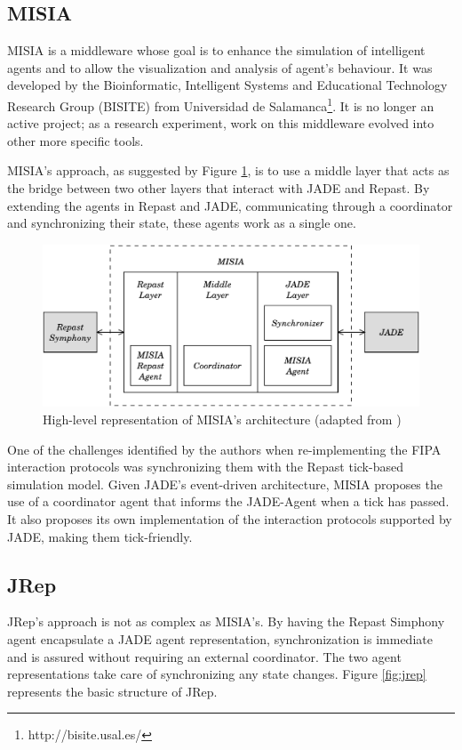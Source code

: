 \documentclass[a4paper,twoside]{article}
\begin{document}
\subsection{MISIA}
MISIA is a middleware whose goal is to enhance the simulation of intelligent agents and to allow the visualization and analysis of agent's behaviour. It was developed by the Bioinformatic, Intelligent Systems and Educational Technology Research Group (BISITE) from Universidad de Salamanca\footnote{http://bisite.usal.es/}. It is no longer an active project; as a research experiment, work on this middleware evolved into other more specific tools.

MISIA's approach, as suggested by Figure \ref{fig:misia}, is to use a middle layer that acts as the bridge between two other layers that interact with JADE and Repast. By extending the agents in Repast and JADE, communicating through a coordinator and synchronizing their state, these agents work as a single one.

\begin{figure}
	\centering
	\includegraphics[width=\linewidth]{../figures/MISIA.pdf}
	\caption[MISIA's architecture]{High-level representation of MISIA's architecture (adapted from \cite{garcia2011misia})}
	\label{fig:misia}
\end{figure}

One of the challenges identified by the authors when re-implementing the FIPA interaction protocols was synchronizing them with the Repast tick-based simulation model. Given JADE's event-driven architecture, MISIA proposes the use of a coordinator agent that informs the JADE-Agent when a tick has passed. It also proposes its own implementation of the interaction protocols supported by JADE, making them tick-friendly.

\subsection{JRep}
JRep's approach is not as complex as MISIA's. By having the Repast Simphony agent encapsulate a JADE agent representation, synchronization is immediate and is assured without requiring an external coordinator.
The two agent representations take care of synchronizing any state changes.
Figure \ref{fig:jrep} represents the basic structure of JRep.
\end{document}
